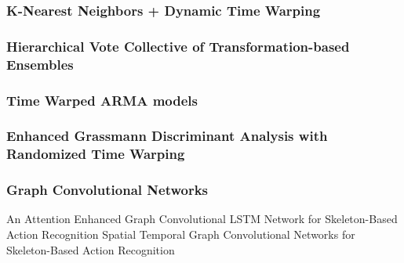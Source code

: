 \subsubsection{K-Nearest Neighbors + Dynamic Time Warping}

\subsubsection{Hierarchical Vote Collective of Transformation-based Ensembles}

\subsubsection{Time Warped ARMA models}

\subsubsection{Enhanced Grassmann Discriminant Analysis with Randomized Time Warping}

\subsubsection{Graph Convolutional Networks}

An Attention Enhanced Graph Convolutional LSTM Network for Skeleton-Based Action Recognition
Spatial Temporal Graph Convolutional Networks for Skeleton-Based Action Recognition
